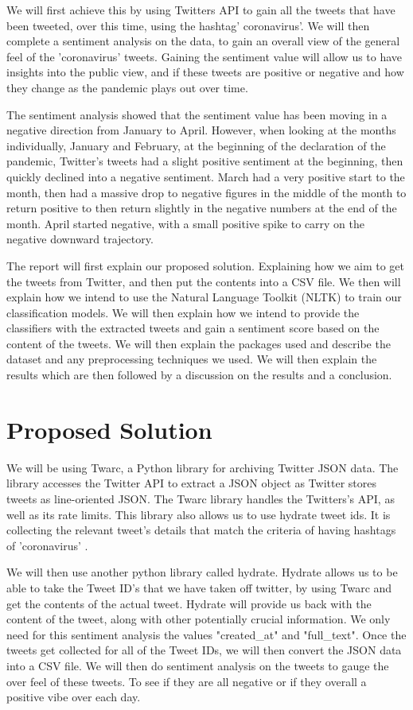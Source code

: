 \documentclass[a4paper,10pt]{article}
\begin{document}
	We will first achieve this by using Twitters API to gain all the tweets that have been tweeted, over this time, using the hashtag' coronavirus'. We will then complete a sentiment analysis on the data, to gain an overall view of the general feel of the 'coronavirus' tweets. Gaining the sentiment value will allow us to have insights into the public view, and if these tweets are positive or negative and how they change as the pandemic plays out over time. 
	
	The sentiment analysis showed that the sentiment value has been moving in a negative direction from January to April. However, when looking at the months individually, January and February, at the beginning of the declaration of the pandemic, Twitter's tweets had a slight positive sentiment at the beginning, then quickly declined into a negative sentiment. March had a very positive start to the month, then had a massive drop to negative figures in the middle of the month to return positive to then return slightly in the negative numbers at the end of the month. April started negative, with a small positive spike to carry on the negative downward trajectory.
	
	The report will first explain our proposed solution. Explaining how we aim to get the tweets from Twitter, and then put the contents into a CSV file. We then will explain how we intend to use the Natural Language Toolkit (NLTK) to train our classification models. We will then explain how we intend to provide the classifiers with the extracted tweets and gain a sentiment score based on the content of the tweets. We will then explain the packages used and describe the dataset and any preprocessing techniques we used. We will then explain the results which are then followed by a discussion on the results and a conclusion.
	
	\section{Proposed Solution}
	We will be using Twarc, a Python library for archiving Twitter JSON data. The library accesses the Twitter API to extract a JSON object as Twitter stores tweets as line-oriented JSON. The Twarc library handles the Twitters's API, as well as its rate limits. This library also allows us to use hydrate tweet ids. It is collecting the relevant tweet's details that match the criteria of having hashtags of 'coronavirus' \cite{twarc}.
	
	We will then use another python library called hydrate. Hydrate allows us to be able to take the Tweet ID's that we have taken off twitter, by using Twarc and get the contents of the actual tweet. Hydrate will provide us back with the content of the tweet, along with other potentially crucial information. We only need for this sentiment analysis the values "created\_at" and "full\_text". Once the tweets get collected for all of the Tweet IDs, we will then convert the JSON data into a CSV file. We will then do sentiment analysis on the tweets to gauge the over feel of these tweets. To see if they are all negative or if they overall a positive vibe over each day.
	
\end{document}
